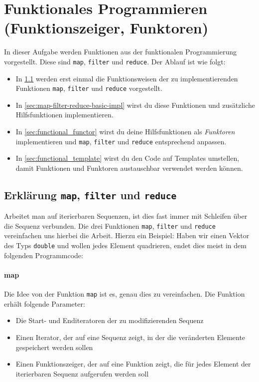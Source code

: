 \section{\ExercisePrefixAdvanced Funktionales Programmieren (Funktionszeiger, Funktoren)}
\label{sec:functional}
{}

In dieser Aufgabe werden Funktionen aus der funktionalen Programmierung vorgestellt.
Diese sind \lstinline{map}, \lstinline{filter} und \lstinline{reduce}.
%
Der Ablauf ist wie folgt:
\begin{itemize}
\item
In \ref{sec:map-filter-reduce-intro} werden erst einmal die Funktionsweisen der zu implementierenden Funktionen \lstinline{map}, \lstinline{filter} und \lstinline{reduce} vorgestellt.
\item
In \ref{sec:map-filter-reduce-basic-impl} wirst du diese Funktionen und zusätzliche Hilfsfunktionen implementieren.
\item
In \ref{sec:functional_functor} wirst du deine Hilfsfunktionen als \emph{Funktoren} implementieren und \lstinline{map}, \lstinline{filter} und \lstinline{reduce} entsprechend anpassen.
\item
In \ref{sec:functional_template} wirst du den Code auf Templates umstellen, damit Funktionen und Funktoren austauschbar verwendet werden können.
\end{itemize}

\subsection{Erklärung \lstinline{map}, \lstinline{filter} und \lstinline{reduce}}
\label{sec:map-filter-reduce-intro}

Arbeitet man auf iterierbaren Sequenzen, ist dies fast immer mit Schleifen über die Sequenz verbunden.
Die drei Funktionen \lstinline{map}, \lstinline{filter} und \lstinline{reduce} vereinfachen uns hierbei die Arbeit.
Hierzu ein Beispiel:
Haben wir einen Vektor des Typs \lstinline{double} und wollen jedes Element quadrieren, endet dies meist in dem folgenden Programmcode:


\paragraph{map}
Die Idee von der Funktion \lstinline{map} ist es, genau dies zu vereinfachen.
Die Funktion erhält folgende Parameter: 
\begin{itemize}
\item
Die Start- und Enditeratoren der zu modifizierenden Sequenz
\item
Einen Iterator, der auf eine Sequenz zeigt, in der die veränderten Elemente gespeichert werden sollen
\item
Einen Funktionszeiger, der auf eine Funktion zeigt, die für jedes Element der iterierbaren Sequenz aufgerufen werden soll
\end{itemize}

